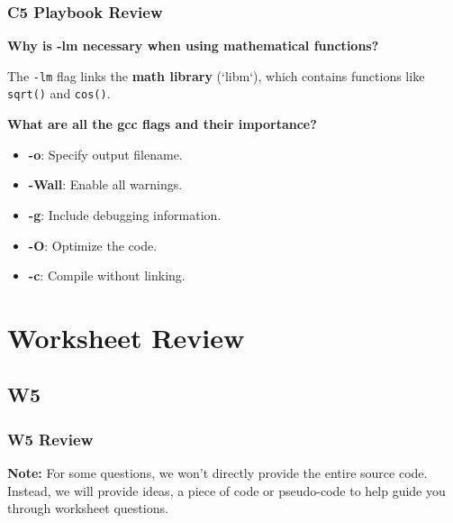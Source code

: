 \documentclass[
	11pt, %
]{beamer}
\begin{document}

















\begin{frame}
	\frametitle{C5 Playbook Review}
	\textbf{Why is -lm necessary when using mathematical functions?}

	The \texttt{-lm} flag links the \textbf{math library} (`libm`), which contains functions like \texttt{sqrt()} and \texttt{cos()}. 

	\textbf{What are all the gcc flags and their importance?}
	\begin{itemize}
		\item \textbf{-o}: Specify output filename.
		\item \textbf{-Wall}: Enable all warnings.
		\item \textbf{-g}: Include debugging information.
		\item \textbf{-O}: Optimize the code.
		\item \textbf{-c}: Compile without linking.
	\end{itemize}
\end{frame}


\section{Worksheet Review}

\subsection{W5}
\frametitle{W5 Review}
\begin{frame}
	\textbf{Note:} For some questions, we won't directly provide the entire source code.
    Instead, we will provide ideas, a piece of code or pseudo-code to help guide you through worksheet questions.
\end{frame}
\end{document}

